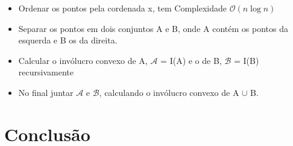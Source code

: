 \documentclass[11pt]{article}
\begin{document}
\begin{itemize}
    \item Ordenar os pontos pela cordenada x, tem Complexidade $\mathcal{O}(n\log{}n)$
    \item Separar os pontos em dois conjuntos A e B, onde A contém os pontos da esquerda e B os da direita.
    \item Calcular o invólucro convexo de A, $\mathcal{A}$ = I(A) e o de B, $\mathcal{B}$ = I(B) recursivamente
    \item No final juntar $\mathcal{A}$ e $\mathcal{B}$, calculando o invólucro convexo de A $\cup$ B.
\end{itemize}

\section{Conclusão}

%
%
%
\end{document}
